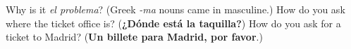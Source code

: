\begin{tcolorbox}[breakable,colback=teal!4,colframe=teal!35!black,title={Before you move on}]
Why is it \emph{el problema}? (Greek \emph{-ma} nouns came in masculine.) How do you ask where the ticket office is? (\textbf{¿Dónde está la taquilla?}) How do you ask for a ticket to Madrid? (\textbf{Un billete para Madrid, por favor}.)
\end{tcolorbox}
